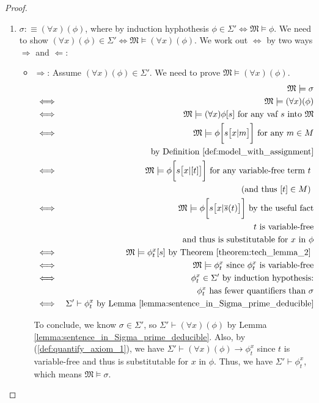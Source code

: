 \documentclass[11pt,letterpaper]{book}
\theoremstyle{definition}
\begin{document}
\begin{enumerate}
\begin{proof}
\begin{enumerate}
\item{$\sigma :\equiv (\forall x) (\phi) $, where by induction
hyphothesis $\phi \in \Sigma' \iff \mathfrak{M} \models \phi $. We need
to show $(\forall x) (\phi) \in \Sigma' \iff \mathfrak{M} \models (\forall
x) (\phi)$. We work out $\iff$ by two ways $\Longrightarrow$ and
$\Longleftarrow$:
\begin{itemize}
\item[]{$\Longrightarrow$: Assume $(\forall x) (\phi) \in \Sigma'$. We
need to prove $\mathfrak{M} \models (\forall x) (\phi)$.
\begin{eqnarray*}
& & \mathfrak{M} \models \sigma \\
& \iff & \mathfrak{M} \models (\forall x) (\phi) \\
& \iff & \mathfrak{M} \models (\forall x) \phi[s] \text{ for any vaf $s$
into $\mathfrak{M}$} \\
& \iff & \mathfrak{M} \models \phi\bigg[ s\big[ x| m \big] \bigg] \text{
for any } m \in M \\
& & \quad \text{ by Definition
\ref{def:model_with_assignment}} \\
& \iff & \mathfrak{M} \models \phi\bigg[ s\big[ x| [t] \big] \bigg]
\text{ for any variable-free term $t$ } \\
& & \quad  \text{(and thus $[t] \in M$) } \\
& \iff &  \mathfrak{M} \models \phi\bigg[ s\big[ x| \overline{s} (t)
\big] \bigg] \text{ by the useful fact}  \\
& & \text{$t$ is variable-free} \\
& & \quad \text{and thus is substitutable for $x$ in
$\phi$} \\
& \iff &  \mathfrak{M} \models \phi_t ^x [s] \text{ by Theorem
\ref{theorem:tech_lemma_2} } \\
& \iff & \mathfrak{M} \models \phi_t ^x \text{ since $\phi_t ^x$ is
variable-free} \\
& \iff & \phi_t ^x \in \Sigma' \text{ by induction hypothesis:} \\
& & \quad \text{$\phi_t
^x$ has fewer quantifiers than $\sigma$} \\
& \iff & \Sigma' \vdash \phi_t ^x \text{ by Lemma
\ref{lemma:sentence_in_Sigma_prime_deducible}}
\end{eqnarray*}

To conclude, we know $\sigma \in \Sigma'$, so $\Sigma' \vdash (\forall x
) (\phi)$ by Lemma \ref{lemma:sentence_in_Sigma_prime_deducible}. Also,
by (\ref{def:quantify_axiom_1}), we have $\Sigma' \vdash (\forall x )
(\phi) \rightarrow \phi_t ^x $ since $t$ is variable-free and thus is
substitutable for $x$ in $\phi$. Thus, we have $\Sigma' \vdash \phi_t
^x$, which means $\mathfrak{M} \models \sigma$.

}
\end{itemize}}
\end{enumerate}
\end{proof}
\end{enumerate}
\end{document}
